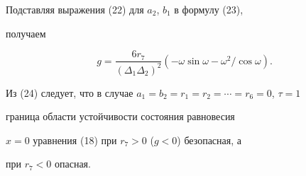 \begin{exam}
Подставляя выражения (22) для $a_2$, $b_1$ в формулу (23), 


получаем 


\begin{equation} 


g=\frac{6r_7}{(\Delta_1\Delta_2)^2} 


(-\omega\sin\omega-\omega^2/\cos\omega). 


\end{equation} 


Из (24) следует, что в случае $a_1=b_2=r_1=r_2=\dotsb=r_6=0$, $\tau=1$ 


граница области устойчивости состояния равновесия 


$x=0$ уравнения (18) при $r_7>0$ ($g<0$) безопасная, а 


при $r_7<0$ опасная. 


\end{exam} 


 


